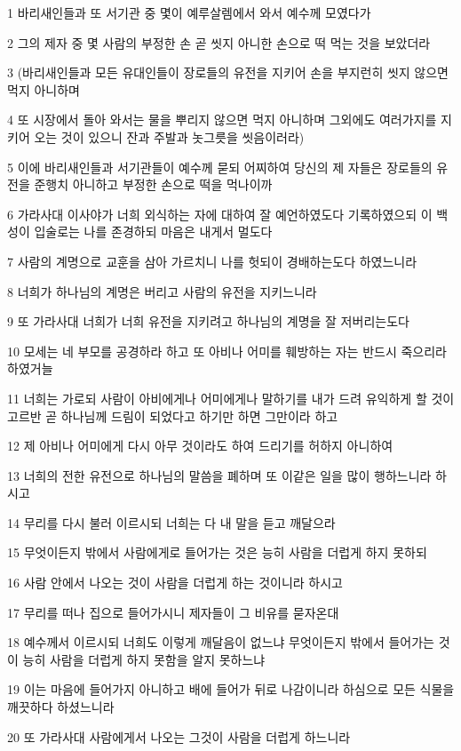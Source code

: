 \par 1 바리새인들과 또 서기관 중 몇이 예루살렘에서 와서 예수께 모였다가
\par 2 그의 제자 중 몇 사람의 부정한 손 곧 씻지 아니한 손으로 떡 먹는 것을 보았더라
\par 3 (바리새인들과 모든 유대인들이 장로들의 유전을 지키어 손을 부지런히 씻지 않으면 먹지 아니하며
\par 4 또 시장에서 돌아 와서는 물을 뿌리지 않으면 먹지 아니하며 그외에도 여러가지를 지키어 오는 것이 있으니 잔과 주발과 놋그릇을 씻음이러라)
\par 5 이에 바리새인들과 서기관들이 예수께 묻되 어찌하여 당신의 제 자들은 장로들의 유전을 준행치 아니하고 부정한 손으로 떡을 먹나이까
\par 6 가라사대 이사야가 너희 외식하는 자에 대하여 잘 예언하였도다 기록하였으되 이 백성이 입술로는 나를 존경하되 마음은 내게서 멀도다
\par 7 사람의 계명으로 교훈을 삼아 가르치니 나를 헛되이 경배하는도다 하였느니라
\par 8 너희가 하나님의 계명은 버리고 사람의 유전을 지키느니라
\par 9 또 가라사대 너희가 너희 유전을 지키려고 하나님의 계명을 잘 저버리는도다
\par 10 모세는 네 부모를 공경하라 하고 또 아비나 어미를 훼방하는 자는 반드시 죽으리라 하였거늘
\par 11 너희는 가로되 사람이 아비에게나 어미에게나 말하기를 내가 드려 유익하게 할 것이 고르반 곧 하나님께 드림이 되었다고 하기만 하면 그만이라 하고
\par 12 제 아비나 어미에게 다시 아무 것이라도 하여 드리기를 허하지 아니하여
\par 13 너희의 전한 유전으로 하나님의 말씀을 폐하며 또 이같은 일을 많이 행하느니라 하시고
\par 14 무리를 다시 불러 이르시되 너희는 다 내 말을 듣고 깨달으라
\par 15 무엇이든지 밖에서 사람에게로 들어가는 것은 능히 사람을 더럽게 하지 못하되
\par 16 사람 안에서 나오는 것이 사람을 더럽게 하는 것이니라 하시고
\par 17 무리를 떠나 집으로 들어가시니 제자들이 그 비유를 묻자온대
\par 18 예수께서 이르시되 너희도 이렇게 깨달음이 없느냐 무엇이든지 밖에서 들어가는 것이 능히 사람을 더럽게 하지 못함을 알지 못하느냐
\par 19 이는 마음에 들어가지 아니하고 배에 들어가 뒤로 나감이니라 하심으로 모든 식물을 깨끗하다 하셨느니라
\par 20 또 가라사대 사람에게서 나오는 그것이 사람을 더럽게 하느니라
